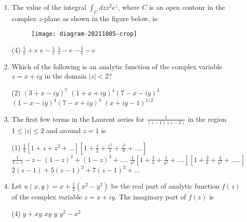 \begin{enumerate}[label=\color{ocre}\textbf{\arabic*.}]
	\item The value of the integral $\int_{C} d z z^{2} e^{z}$, where $C$ is an open contour in the complex $z$-plane as shown in the figure below, is:
	{}
	\begin{figure}[H]
		\centering
		\texttt{[image: diagram-20211005-crop]}
	\end{figure}
	\begin{tasks}(4)
		\task[\textbf{A.}] $\frac{5}{e}+e$
		\task[\textbf{B.}] $e-\frac{5}{e}$
		\task[\textbf{C.}] $\frac{5}{e}-e$
		\task[\textbf{D.}] $-\frac{5}{e}-e$
	\end{tasks}
	
	\item Which of the following is an analytic function of the complex variable $z=x+i y$ in the domain $|z|<2 ?$
	{}
	\begin{tasks}(2)
		\task[\textbf{A.}] $(3+x-i y)^{7}$
		\task[\textbf{B.}] $(1+x+i y)^{4}(7-x-i y)^{3}$
		\task[\textbf{C.}] $(1-x-i y)^{4}(7-x+i y)^{3}$
		\task[\textbf{D.}] $(x+i y-1)^{1 / 2}$
	\end{tasks}

	\item The first few terms in the Laurent series for $\frac{1}{(z-1)(z-2)}$ in the region $1 \leq|z| \leq 2$ and around $z=1$ is
	{}
	\begin{tasks}(1)
		\task[\textbf{A.}] $\frac{1}{2}\left[1+z+z^{2}+\ldots\right]\left[1+\frac{z}{2}+\frac{z^{2}}{4}+\frac{z^{3}}{8}+\ldots .\right]$
		\task[\textbf{B.}] $\frac{1}{1-z}-z-(1-z)^{2}+(1-z)^{3}+\ldots .$
		\task[\textbf{C.}] $\frac{1}{\mathrm{z}^{2}}\left[1+\frac{1}{\mathrm{z}}+\frac{1}{\mathrm{z}^{2}}+\ldots .\right]\left[1+\frac{2}{\mathrm{z}}+\frac{4}{\mathrm{z}^{2}}+\ldots . .\right]$
		\task[\textbf{D.}]  $2(z-1)+5(z-1)^{2}+7(z-1)^{3}+\ldots$
	\end{tasks}
	
	\item Let $u(x, y)=x+\frac{1}{2}\left(x^{2}-y^{2}\right)$ be the real part of analytic function $f(z)$ of the complex variable $z=x+i y$. The imaginary part of $f(z)$ is
	{}
	\begin{tasks}(4)
		\task[\textbf{A.}] $y+x y$
		\task[\textbf{B.}] $x y$
		\task[\textbf{C.}] $y$
		\task[\textbf{D.}] $y^{2}-x^{2}$
	\end{tasks}


\end{enumerate}
